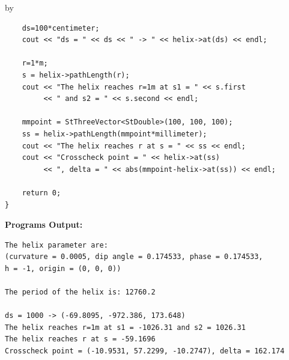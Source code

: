 \documentclass[twoside]{article}
\newcommand{\entrylabel}[1]{\mbox{\textbf{{#1}}}\hfil}%
\newenvironment{entry}
{\begin{list}{}%
    {\renewcommand{\makelabel}{\entrylabel}%
     \setlength{\labelwidth}{90pt}%
     \setlength{\leftmargin}{\labelwidth}
     \advance\leftmargin by \labelsep%
      }%
    }%
  {\end{list}}
\newcommand{\Entrylabel}[1]%
{\raisebox{0pt}[1ex][0pt]{\makebox[\labelwidth][l]%
    {\parbox[t]{\labelwidth}{\hspace{0pt}\textbf{{#1}}}}}}
\newenvironment{Entry}%
{\renewcommand{\entrylabel}{\Entrylabel}\begin{entry}}%
  {\end{entry}}
\begin{document}
\begin{Entry}
{\begin{verbatim}
    ds=100*centimeter;
    cout << "ds = " << ds << " -> " << helix->at(ds) << endl;

    r=1*m;
    s = helix->pathLength(r);
    cout << "The helix reaches r=1m at s1 = " << s.first
         << " and s2 = " << s.second << endl;

    mmpoint = StThreeVector<StDouble>(100, 100, 100);
    ss = helix->pathLength(mmpoint*millimeter);
    cout << "The helix reaches r at s = " << ss << endl;
    cout << "Crosscheck point = " << helix->at(ss)
         << ", delta = " << abs(mmpoint-helix->at(ss)) << endl;

    return 0;
}
\end{verbatim}
}%
{\bf Programs Output:}
{\footnotesize
\begin{verbatim}
The helix parameter are:
(curvature = 0.0005, dip angle = 0.174533, phase = 0.174533,
h = -1, origin = (0, 0, 0))

The period of the helix is: 12760.2

ds = 1000 -> (-69.8095, -972.386, 173.648)
The helix reaches r=1m at s1 = -1026.31 and s2 = 1026.31
The helix reaches r at s = -59.1696
Crosscheck point = (-10.9531, 57.2299, -10.2747), delta = 162.174

\end{verbatim}
} %
\end{Entry}

\clearpage

%
%
\end{document}
